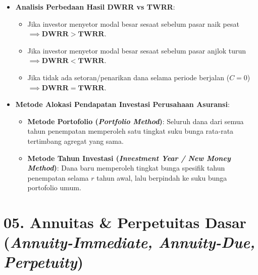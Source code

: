 \documentclass[10pt,a4paper]{article}
\begin{document}
\begin{jebakanbox}
\begin{itemize}[leftmargin=1.5em, topsep=1.5pt, itemsep=2pt]
    \item \textbf{Analisis Perbedaan Hasil DWRR vs TWRR}:
    \begin{itemize}[leftmargin=1.2em, topsep=1pt, itemsep=1.5pt]
        \item Jika investor menyetor modal besar sesaat sebelum pasar naik pesat $\implies \mathbf{DWRR > TWRR}$.
        \item Jika investor menyetor modal besar sesaat sebelum pasar anjlok turun $\implies \mathbf{DWRR < TWRR}$.
        \item Jika tidak ada setoran/penarikan dana selama periode berjalan ($C=0$) $\implies \mathbf{DWRR = TWRR}$.
    \end{itemize}
    \item \textbf{Metode Alokasi Pendapatan Investasi Perusahaan Asuransi}:
    \begin{itemize}[leftmargin=1.2em, topsep=1pt, itemsep=1.5pt]
        \item \textbf{Metode Portofolio (\textit{Portfolio Method})}: Seluruh dana dari semua tahun penempatan memperoleh satu tingkat suku bunga rata-rata tertimbang agregat yang sama.
        \item \textbf{Metode Tahun Investasi (\textit{Investment Year / New Money Method})}: Dana baru memperoleh tingkat bunga spesifik tahun penempatan selama $r$ tahun awal, lalu berpindah ke suku bunga portofolio umum.
    \end{itemize}
\end{itemize}
\end{jebakanbox}

\section*{\large 05. Annuitas \& Perpetuitas Dasar (\textit{Annuity-Immediate, Annuity-Due, Perpetuity})}
\end{document}
